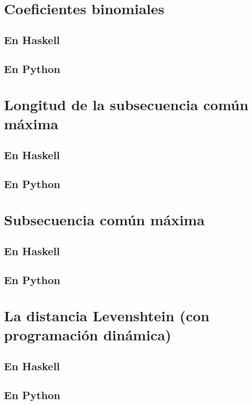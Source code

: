 \documentclass[a4paper,12pt,twoside]{book}
\begin{document}
\section{Coeficientes binomiales}
\subsection{En Haskell}
\subsection{En Python}

\section{Longitud de la subsecuencia común máxima}
\subsection{En Haskell}
\subsection{En Python}

\section{Subsecuencia común máxima}
\subsection{En Haskell}
\subsection{En Python}

\section{La distancia Levenshtein (con programación dinámica)}
\subsection{En Haskell}
\subsection{En Python}
\end{document}
